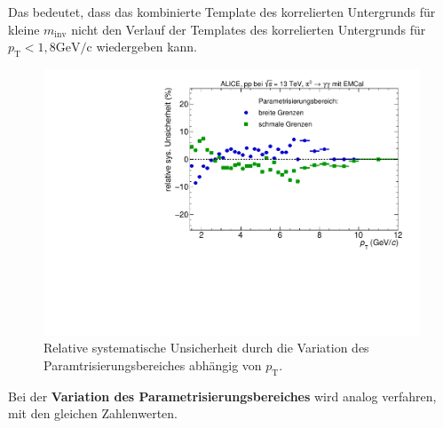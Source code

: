 Das bedeutet, dass das kombinierte Template des korrelierten Untergrunds für kleine $m_\text{inv}$ nicht den Verlauf der Templates des korrelierten Untergrunds für $p_\text{T} < 1,8 \text{GeV/c}$ wiedergeben kann.
\begin{figure}[t!]
\centering
\includegraphics[width=.65\linewidth]{YieldsSysUncerFitRange_Data_2016.pdf}
\caption{Relative systematische Unsicherheit durch die Variation des Paramtrisierungsbereiches abhängig von $p_\text{T}$.}
\label{fig:ParamSys}
\end{figure}
\newline
Bei der \textbf{Variation des Parametrisierungsbereiches} wird analog verfahren, mit den gleichen Zahlenwerten.

